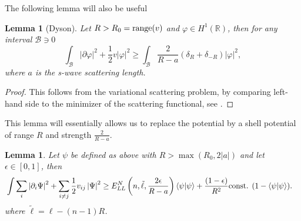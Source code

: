 \documentclass[a4paper,11pt]{article}
\newcommand{\abs}[1]{\left\lvert #1 \right\rvert}
\renewcommand{\braket}[1]{\left\langle#1\right\rangle}
\newcommand{\R}{\mathbb{R}}
\newtheorem{lemma}[theorem]{Lemma}
\numberwithin{equation}{section}
\begin{document}
	
	
	The following lemma will also be useful \begin{lemma}[Dyson]\label{LemmaDyson} Let $ R>R_0=\textnormal{range}(v) $ and $ \varphi\in H^1(\R) $, then for any interval $ \mathcal{B}\ni 0 $ 
		\begin{equation}
		\int_{\mathcal{B}} \abs{\partial \varphi}^2+\frac12 v\abs{\varphi}^2\geq \int_{\mathcal{B}}\frac{2}{R-a}\left(\delta_R+\delta_{-R}\right)\abs{\varphi}^2,
		\end{equation}
		where $ a $ is the s-wave scattering length.
	\end{lemma}
	\begin{proof}
		This follows from the variational scattering problem, by comparing left-hand side to the minimizer of the scattering functional, see \cite{lieb2006mathematics}.
	\end{proof}
	This lemma will essentially allows us to replace the potential by a shell potential of range $ R $ and strength $ \frac{2}{R-a} $.\\
	\begin{lemma}\label{LemmaNormBoundEpsilon}
		Let $ \psi $ be defined as above with $R>\max\left(R_0,2\abs{a}\right) $ and let $ \epsilon\in[0,1] $, then
		\begin{equation}
		\begin{aligned}
		&\int \sum_{i}\abs{\partial_i\Psi}^2+\sum_{i\neq j} \frac{1}{2}v_{ij}\abs{\Psi}^2\geq E_{LL}^N \left(n,\tilde{\ell},\frac{2\epsilon}{R-a}\right)\braket{\psi|\psi}+ \frac{(1-\epsilon)}{R^2}\textnormal{const. }(1-\braket{\psi|\psi}).
		\end{aligned}
		\end{equation}
		where $ \tilde{\ell}=\ell-(n-1)R $.
	\end{lemma}
\end{document}

